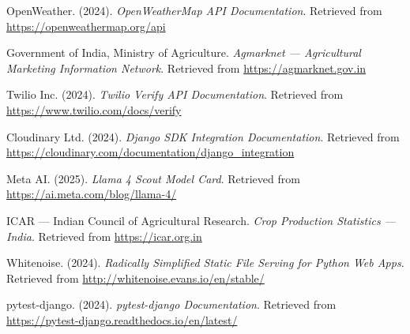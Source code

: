 \documentclass[12pt,a4paper]{article}
\begin{document}
\noindent [5] OpenWeather. (2024). \textit{OpenWeatherMap API Documentation}. Retrieved from \url{https://openweathermap.org/api}

\noindent [6] Government of India, Ministry of Agriculture. \textit{Agmarknet --- Agricultural Marketing Information Network}. Retrieved from \url{https://agmarknet.gov.in}

\noindent [7] Twilio Inc. (2024). \textit{Twilio Verify API Documentation}. Retrieved from \url{https://www.twilio.com/docs/verify}

\noindent [8] Cloudinary Ltd. (2024). \textit{Django SDK Integration Documentation}. Retrieved from \url{https://cloudinary.com/documentation/django_integration}

\noindent [9] Meta AI. (2025). \textit{Llama 4 Scout Model Card}. Retrieved from \url{https://ai.meta.com/blog/llama-4/}

\noindent [10] ICAR --- Indian Council of Agricultural Research. \textit{Crop Production Statistics --- India}. Retrieved from \url{https://icar.org.in}

\noindent [11] Whitenoise. (2024). \textit{Radically Simplified Static File Serving for Python Web Apps}. Retrieved from \url{http://whitenoise.evans.io/en/stable/}

\noindent [12] pytest-django. (2024). \textit{pytest-django Documentation}. Retrieved from \url{https://pytest-django.readthedocs.io/en/latest/}
\end{document}
